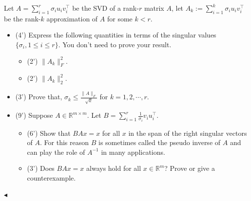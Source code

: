 \documentclass[11pt]{article}
\newenvironment{problem}[2][Problem]{\begin{trivlist}
\item[\hskip \labelsep {\bfseries #1}\hskip \labelsep {\bfseries #2.}]}{\hfill$\blacktriangleleft$\end{trivlist}}
\begin{document}
\begin{problem}{5 (16')}
Let $A=\sum_{i=1}^{r}\sigma_iu_iv_i^\top$ be the SVD of a rank-$r$ matrix $A$, let $A_k:=\sum_{i=1}^k\sigma_iu_iv_i^\top$ be the rank-$k$ approximation of $A$ for some $k<r$. 
\begin{itemize}
    \item [(1)] (4') Express the following quantities in terms of the singular values $\{\sigma_i,1\le i\le r\}$. You don't need to prove your result.
    \begin{itemize}
        \item [(a)] (2') $\|A_k\|_F^2$.
        \item [(b)] (2') $\|A_k\|_2^2$.
    \end{itemize}
    \item [(2)] (3') Prove that, $\sigma_k\le \frac{\|A\|_F}{\sqrt{k}}$ for $k=1,2,\cdots,r$.
    \item [(3)] (9') Suppose $A\in\mathbb{R}^{m\times m}$. Let $B=\sum_{i=1}^r\frac{1}{\sigma_i}v_iu_i^\top$.  
    \begin{itemize}
        \item [(a)] (6') Show that $BAx=x$ for all $x$ in the span of the right singular vectors of $A$. For this reason $B$ is sometimes called the pseudo inverse of $A$ and can play the role of $A^{-1}$ in many applications.
        \item [(b)] (3') Does $BAx=x$ always hold for all $x\in\mathbb{R}^m$? Prove or give a counterexample.
    \end{itemize}
\end{itemize}
\end{problem}
\end{document}
